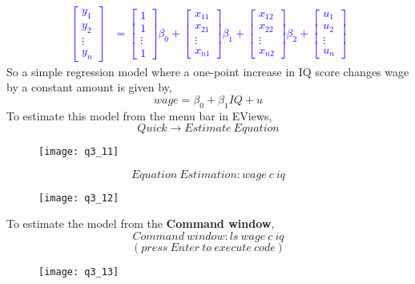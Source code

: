 \documentclass[12pt]{report}
\newenvironment{blueframed}[1][blue]
{\def\FrameCommand{\fboxsep=\FrameSep\fcolorbox{#1}{white}}%
\MakeFramed {\advance\hsize-\width \FrameRestore}}
{\endMakeFramed}
\begin{document}
\begin{blueframed}
	\textcolor{blue}{\begin{align*}
		\begin{bmatrix}
		y_{1} \\
		y_{2} \\
		\vdots \\
		y_{n} 
		\end{bmatrix}
		&= 
		\begin{bmatrix}
		1 \\
		1 \\
		\vdots \\
		1   
		\end{bmatrix}
		\beta_0
		+
		\begin{bmatrix}
		x_{11} \\
		x_{21} \\
		\vdots \\
		x_{n1}   
		\end{bmatrix}
		\beta_1
		+
		\begin{bmatrix}
		x_{12} \\
		x_{22} \\
		\vdots \\
		x_{n2}   
		\end{bmatrix}
		\beta_2
		+
		\begin{bmatrix}
		u_{1} \\
		u_{2} \\
		\vdots \\
		u_{n} 
		\end{bmatrix}
		\end{align*}
	}
\end{blueframed}
\noindent So a simple regression model where a one-point increase in IQ score changes wage by a constant amount is given by,
$$wage=\beta_0+\beta_1IQ+u$$
\noindent To estimate this model from the menu bar in EViews,
$$Quick \to Estimate\ Equation$$
\begin{figure}[H]
	\centering
	\texttt{[image: q3\_11]}
\end{figure}
\vspace{-\baselineskip}
$$Equation\ Estimation: wage\ c\ iq$$
\begin{figure}[H]
	\centering
	\texttt{[image: q3\_12]}
\end{figure}
\vspace{-\baselineskip}
\noindent To estimate the model from the \textbf{Command window},
$$Command\ window: ls\ wage\ c\ iq$$
$$(press\ Enter\ to\ execute\ code)$$
\begin{figure}[H]
	\centering
	\texttt{[image: q3\_13]}
\end{figure}
\end{document}
